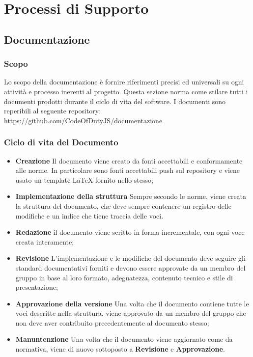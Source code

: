 \section{Processi di Supporto}
	\subsection{Documentazione}
	    
	    \subsubsection{Scopo}
	    Lo scopo della documentazione è fornire riferimenti precisi ed universali su ogni attività e processo inerenti al progetto. Questa sezione norma come stilare tutti i documenti prodotti durante il ciclo di vita del software. I documenti sono reperibili al seguente repository:
	    \url{https://github.com/CodeOfDutyJS/documentazione}
	    
	    \subsubsection{Ciclo di vita del Documento}
	    \begin{itemize}
	        \item \textbf{Creazione} Il documento viene creato da fonti accettabili e conformamente alle norme. In particolare sono fonti accettabili push sul repository e viene usato un template LaTeX fornito nello stesso;
	        \item \textbf{Implementazione della struttura} Sempre secondo le norme, viene creata la struttura del documento, che deve sempre contenere un registro delle modifiche e un indice che tiene traccia delle voci.
	        \item \textbf{Redazione} il documento viene scritto in forma incrementale, con ogni voce creata interamente;
	        \item \textbf{Revisione} L'implementazione e le modifiche del documento deve seguire gli standard documentativi forniti e devono essere approvate da un membro del gruppo in base al loro formato, adeguatezza, contenuto tecnico e stile di presentazione;
	        \item \textbf{Approvazione della versione} Una volta che il documento contiene tutte le voci descritte nella struttura, viene approvato da un membro del gruppo che non deve aver contribuito precedentemente al documento stesso;
	        \item \textbf{Manuntenzione} Una volta che il documento viene aggiornato come da normativa, viene di nuovo sottoposto a \textbf{Revisione} e \textbf{Approvazione}.
	    \end{itemize}
	    
